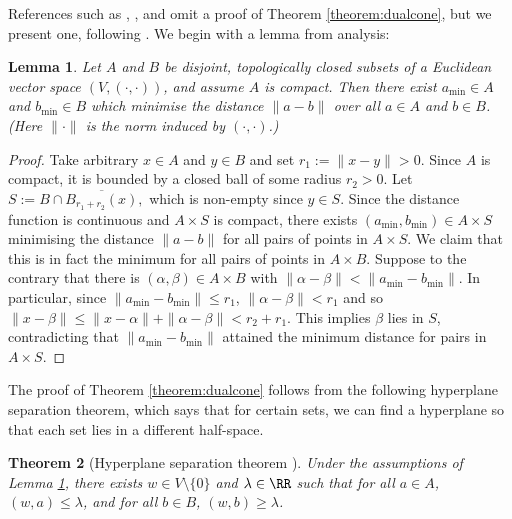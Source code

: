 \documentclass[12pt]{amsart}
\theoremstyle{plain}
\newtheorem{theorem}{Theorem}[subsection]
\newtheorem{lemma}[theorem]{Lemma}
\begin{document}
References such as \cite{Fulton93}, \cite{CLS11}, and \cite{Oda88} omit a proof of Theorem \ref{theorem:dualcone}, but we present one, following \cite{BV04}.
We begin with a lemma from analysis:

\begin{lemma}\label{lemma:mindistance}
Let $A$ and $B$ be disjoint, topologically closed subsets of a Euclidean vector space $(V, (\cdot,\cdot))$, and assume $A$ is compact.
Then there exist $a_{\text{min}} \in A$ and $b_{\text{min}} \in B$ which minimise the distance $\|a-b\|$ over all $a \in A$ and $b \in B$.
(Here $\|\cdot\|$ is the norm induced by $(\cdot,\cdot)$.)
\end{lemma}
\begin{proof}
Take arbitrary $x \in A$ and $y \in B$ and set $r_1 := \|x-y\| > 0$.
Since $A$ is compact, it is bounded by a closed ball of some radius $r_2 > 0$.
Let $S := B \cap \overline{B_{r_1+r_2}(x)},$ which is non-empty since $y \in S$.
Since the distance function is continuous and $A \times S$ is compact, there exists $(a_{\text{min}}, b_{\text{min}}) \in A \times S$ minimising the distance $\|a - b\|$ for all pairs of points in $A \times S$.
We claim that this is in fact the minimum for all pairs of points in $A \times B$.
Suppose to the contrary that there is $(\alpha,\beta) \in A \times B$ with $\|\alpha - \beta\| < \|a_{\text{min}} - b_{\text{min}}\|$. 
In particular, since $\|a_{\text{min}} - b_{\text{min}}\|\le r_1$, $\|\alpha - \beta\| < r_1$ and so
$\|x - \beta\| \le \|x- \alpha\| + \|\alpha - \beta\| < r_2 + r_1.$
This implies $\beta$ lies in $S$, contradicting that $\|a_{\text{min}} - b_{\text{min}}\|$ attained the minimum distance for pairs in $A \times S$.
\end{proof}

The proof of Theorem \ref{theorem:dualcone} follows from the following hyperplane separation theorem, which says that for certain sets, we can find a hyperplane so that each set lies in a different half-space.

\begin{theorem}[Hyperplane separation theorem {\cite[\S 2.5.1]{BV04}}]\label{hyperplaneseparation}
Under the assumptions of Lemma \ref{lemma:mindistance}, there exists $w \in V\setminus\{0\}$ and $\lambda \in \RR$ such that for all $a \in A$, $(w, a) \le \lambda$, and for all $b \in B$, $(w, b) \ge \lambda$.
\end{theorem}
\end{document}
